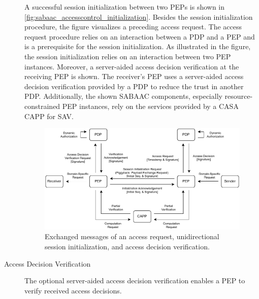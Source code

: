 \begin{description}
    A successful session initialization between two PEPs is shown in \autoref{fig:sabaac_accesscontrol_initialization}.
    Besides the session initialization procedure, the figure visualizes a preceding access request.
    The access request procedure relies on an interaction between a PDP and a PEP and is a prerequisite for the session initialization.
    As illustrated in the figure, the session initialization relies on an interaction between two PEP instances.
    Moreover, a server-aided access decision verification at the receiving PEP is shown.
    The receiver's PEP uses a server-aided access decision verification provided by a PDP to reduce the trust in another PDP.
    Additionally, the shown SABAAC components, especially resource-constrained PEP instances, rely on the services provided by a CASA CAPP for SAV.
    \begin{figure}
        \centering
        \includegraphics[width=1.0\linewidth]{figures/SABAAC_protocols_accesscontrol_initialization.drawio.pdf}
        \caption{Exchanged messages of an access request, unidirectional session initialization, and access decision verification.
        }
        \label{fig:sabaac_accesscontrol_initialization}
    \end{figure}
    \item[Access Decision Verification] The optional server-aided access decision verification enables a PEP to verify received access decisions.

\end{description}
